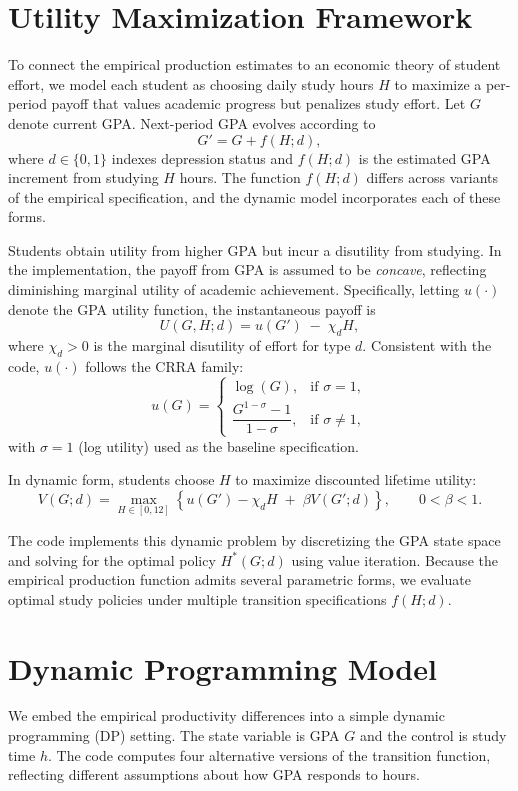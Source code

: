 \documentclass[12pt]{article}
\begin{document}
\section{Utility Maximization Framework}

To connect the empirical production estimates to an economic theory of
student effort, we model each student as choosing daily study hours $H$
to maximize a per-period payoff that values academic progress but
penalizes study effort. Let $G$ denote current GPA. Next-period GPA 
evolves according to
\[
G' = G + f(H; d),
\]
where $d \in \{0,1\}$ indexes depression status and $f(H;d)$ is the 
estimated GPA increment from studying $H$ hours. The function $f(H;d)$
differs across variants of the empirical specification, and the dynamic
model incorporates each of these forms.

Students obtain utility from higher GPA but incur a disutility from 
studying. In the implementation, the payoff from GPA is assumed to be 
\emph{concave}, reflecting diminishing marginal utility of academic 
achievement. Specifically, letting $u(\cdot)$ denote the GPA utility 
function, the instantaneous payoff is
\[
U(G,H;d) = u(G') \;-\; \chi_d H,
\]
where $\chi_d>0$ is the marginal disutility of effort for type $d$.
Consistent with the code, $u(\cdot)$ follows the CRRA family:
\[
u(G) =
\begin{cases}
\log(G), & \text{if } \sigma = 1,\\[6pt]
\dfrac{G^{1-\sigma}-1}{\,1-\sigma\,}, & \text{if } \sigma \neq 1,
\end{cases}
\]
with $\sigma=1$ (log utility) used as the baseline specification.

In dynamic form, students choose $H$ to maximize discounted lifetime
utility:
\[
V(G;d)
=
\max_{H \in [0,12]}
\left\{
u(G') - \chi_d H
\;+\;
\beta V(G';d)
\right\},
\qquad 0<\beta<1.
\]

The code implements this dynamic problem by discretizing the GPA state
space and solving for the optimal policy $H^*(G;d)$ using value
iteration. Because the empirical production function admits several
parametric forms, we evaluate optimal study policies under multiple
transition specifications $f(H;d)$.


\section{Dynamic Programming Model}
\label{sec:dp}

We embed the empirical productivity differences into a simple dynamic
programming (DP) setting. The state variable is GPA $G$ and the control
is study time $h$. The code computes four alternative versions of the
transition function, reflecting different assumptions about how GPA
responds to hours.
\end{document}
